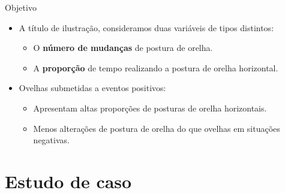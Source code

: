 \documentclass[
  ignorenonframetext,
  serif,
  professionalfont,
  usenames,
  dvipsnames,
  aspectratio = 169]{beamer}
\providecommand{\tightlist}{%
  \setlength{\itemsep}{0pt}\setlength{\parskip}{0pt}}
\renewcommand{\tightlist}{%
  \setlength{\itemsep}{0\baselineskip}
  \setlength{\parskip}{0.25\baselineskip}
}
\def\beginAHalfColumn{\begin{minipage}{0.49\textwidth}}%
\def\endColumns{\end{minipage}}%
\begin{document}
\begin{frame}{Objetivo}
\protect\hypertarget{objetivo-2}{}
\beginAHalfColumn

\begin{itemize}
\tightlist
\item
  A título de ilustração, consideramos duas variáveis de tipos
  distintos:

  \begin{itemize}
  \tightlist
  \item
    O \textbf{número de mudanças} de postura de orelha.
  \item
    A \textbf{proporção} de tempo realizando a postura de orelha
    horizontal.
  \end{itemize}
\end{itemize}

\endColumns
\beginAHalfColumn

\begin{itemize}
\tightlist
\item
  Ovelhas submetidas a eventos positivos:

  \begin{itemize}
  \tightlist
  \item
    Apresentam altas proporções de posturas de orelha horizontais.
  \item
    Menos alterações de postura de orelha do que ovelhas em situações
    negativas.
  \end{itemize}
\end{itemize}

\endColumns
\end{frame}

\hypertarget{estudo-de-caso}{%
\section{Estudo de caso}\label{estudo-de-caso}}
\end{document}
